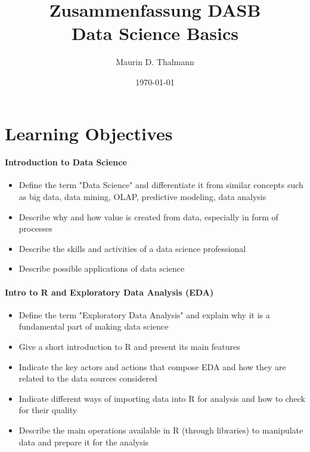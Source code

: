 \documentclass[a4paper]{article}
\title{\textbf{Zusammenfassung DASB} \\
Data Science Basics}
\date{\today}
\author{Maurin D. Thalmann}
\begin{document}
	
	\maketitle
	
	\newpage
	\tableofcontents
	
	\newpage
	
	\section{Learning Objectives}
	
		\paragraph{Introduction to Data Science}
		
			\begin{itemize}
				\item Define the term "Data Science" and differentiate it from similar concepts such as big data, data mining, OLAP, predictive modeling, data analysis
				\item Describe why and how value is created from data, especially in form of processes
				\item Describe the skills and activities of a data science professional
				\item Describe possible applications of data science
			\end{itemize}
		
		\paragraph{Intro to R and Exploratory Data Analysis (EDA)}
		
			\begin{itemize}
				\item Define the term "Exploratory Data Analysis" and explain why it is a fundamental part of making data science
				\item Give a short introduction to R and present its main features
				\item Indicate the key actors and actions that compose EDA and how they are related to the data sources considered
				\item Indicate different ways of importing data into R for analysis and how to check for their quality
				\item Describe the main operations available in R (through libraries) to manipulate data and prepare it for the analysis
			\end{itemize}
		
\end{document}
